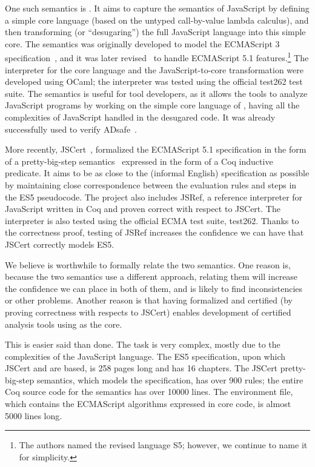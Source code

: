 \documentclass{llncs}
\begin{document}
One such semantics is \lambdajs. It aims to capture
the semantics of JavaScript by defining a simple core language
(based on the untyped call-by-value lambda calculus), and then
transforming (or ``desugaring'') the full JavaScript language into this
simple core. The \lambdajs semantics was originally developed to model the 
ECMAScript 3 specification~\cite{Guha-al:ECOOP10}, and it was later
revised~\cite{Politz-al:DLS12} to handle ECMAScript 5.1
features.\footnote{The authors named the revised language S5; however,
we continue to name it \lambdajs for simplicity.}
The interpreter for the core language and the JavaScript-to-core
transformation were developed using 
OCaml\cite{github:brownplt/LambdaS5};
the interpreter was tested using the official test262 test suite.
The \lambdajs semantics is useful for tool developers, as it
allows the tools to analyze JavaScript programs by working
on the simple core language of \lambdajs, having all the complexities
of JavaScript handled in the desugared code. It was already
successfully used to verify ADsafe~\cite{Politz-al:SEC11}.

More recently, JSCert~\cite{Bodin-al:POPL14},
formalized the ECMAScript 5.1 specification in the form of
a pretty-big-step semantics~\cite{Chargueraud:ESOP13} expressed in 
the form of a Coq inductive predicate. It aims to be as close to the
(informal English) specification as possible by maintaining close correspondence
between the evaluation rules and steps in the ES5 pseudocode. The project
also includes JSRef, a reference interpreter for JavaScript written in Coq
and proven correct with respect to JSCert. The interpreter is also tested
using the official ECMA test suite, test262. Thanks to the correctness proof,
testing of JSRef increases the confidence we can have that JSCert
correctly models ES5.

We believe is worthwhile to formally relate the two semantics. One reason is,
because the two semantics use a different approach, relating
them will increase the confidence we can place in both of them,
and is likely to find inconsistencies or other problems. Another reason is
that having \lambdajs formalized and certified (by proving correctness
with respects to JSCert) enables development of certified analysis tools
using \lambdajs as the core.

This is easier said than done. The task is very complex, mostly due
to the complexities of the JavaScript language. The ES5 specification,
upon which JSCert and \lambdajs are based, is 258 pages long and 
has 16 chapters. The JSCert pretty-big-step semantics, which models
the specification, has over 900 rules; the entire Coq source code
for the semantics has over 10000 lines. The \lambdajs environment
file, which contains the ECMAScript algorithms expressed in core
\lambdajs code, is almost 5000 lines long.
\end{document}
